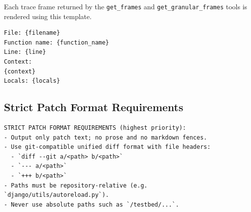 Each trace frame returned by the \texttt{get\_frames} and \texttt{get\_granular\_frames} tools is rendered using this template. 

\begin{Verbatim}[fontsize=\small]
File: {filename}
Function name: {function_name}
Line: {line}
Context:
{context}
Locals: {locals}
\end{Verbatim}

\subsection{Strict Patch Format Requirements}
\label{subsec:prompt-strict-patch}

\begin{Verbatim}[fontsize=\small]
STRICT PATCH FORMAT REQUIREMENTS (highest priority):
- Output only patch text; no prose and no markdown fences.
- Use git-compatible unified diff format with file headers:
  - `diff --git a/<path> b/<path>`
  - `--- a/<path>`
  - `+++ b/<path>`
- Paths must be repository-relative (e.g. `django/utils/autoreload.py`).
- Never use absolute paths such as `/testbed/...`.
\end{Verbatim}

